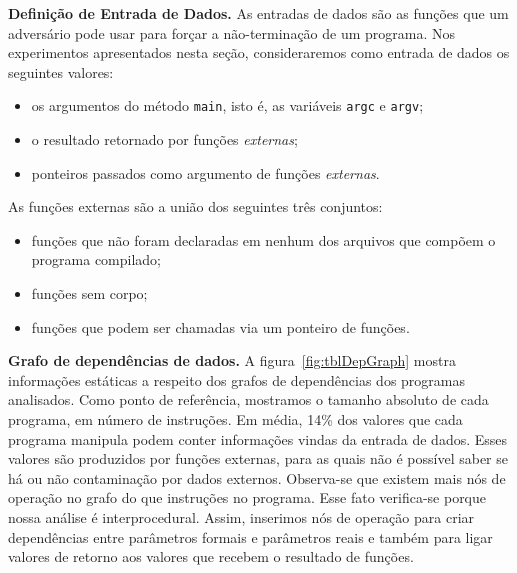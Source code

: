 \documentclass{llncs}
\begin{document}
\noindent
\textbf{Definição de Entrada de Dados.}
As entradas de dados são as funções que um adversário pode usar para forçar
a não-terminação de um programa.
Nos experimentos apresentados nesta seção, consideraremos como entrada de
dados os seguintes valores:
\begin{itemize}
\item os argumentos do método \texttt{main}, isto é, as variáveis \texttt{argc}
e \texttt{argv};
\item o resultado retornado por funções {\em externas};
\item ponteiros passados como argumento de funções {\em externas}.
\end{itemize}
As funções externas são a união dos seguintes três conjuntos:
\begin{itemize}
\item funções que não foram declaradas em nenhum dos arquivos que compõem
o programa compilado;
\item funções sem corpo;
\item funções que podem ser chamadas via um ponteiro de funções.
\end{itemize}

\noindent
\textbf{Grafo de dependências de dados. }
A figura~\ref{fig:tblDepGraph} mostra informações estáticas a respeito dos
grafos de dependências dos programas analisados.
Como ponto de referência, mostramos o tamanho absoluto de cada programa, em
número de  instruções.
Em média, 14\% dos valores que cada programa manipula podem
conter informações vindas da entrada de dados.
Esses valores são produzidos por funções externas, para as quais não é
possível saber se há ou não contaminação por dados externos.
Observa-se que existem mais nós de operação no grafo do que instruções no
programa.
Esse fato verifica-se porque nossa análise é interprocedural.
Assim, inserimos nós de operação para criar dependências entre parâmetros
formais e parâmetros reais e também para ligar valores de retorno aos valores
que recebem o resultado de funções.
\end{document}
